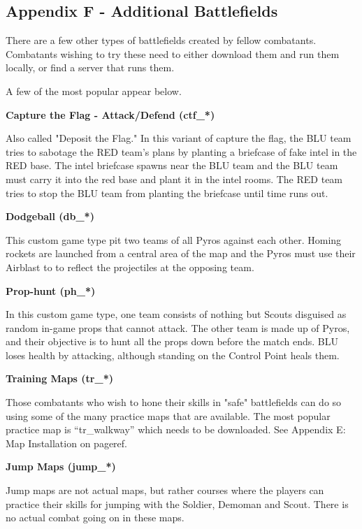 \subsection{Appendix F - Additional Battlefields}
There are a few other types of battlefields created by fellow combatants.  Combatants wishing to try these need to either download them and run them locally, or find a server that runs them.

A few of the most popular appear below.

{\bf Capture the Flag - Attack/Defend (ctf\_*)}

Also called "Deposit the Flag." In this variant of capture the flag, the BLU team tries to sabotage the RED team's plans by planting a briefcase of fake intel in the RED base. The intel briefcase spawns near the BLU team and the BLU team must carry it into the red base and plant it in the intel rooms. The RED team tries to stop the BLU team from planting the briefcase until time runs out.

{\bf Dodgeball (db\_*)}

This custom game type pit two teams of all Pyros against each other. Homing rockets are launched from a central area of the map and the Pyros must use their Airblast to to reflect the projectiles at the opposing team.

{\bf Prop-hunt (ph\_*)}

In this custom game type, one team consists of nothing but Scouts disguised as random in-game props that cannot attack. The other team is made up of Pyros, and their objective is to hunt all the props down before the match ends. BLU loses health by attacking, although standing on the Control Point heals them.

{\bf Training Maps (tr\_*)}

Those combatants who wish to hone their skills in "safe" battlefields can do so using some of the many practice maps that are available.  The most popular practice map is “tr\_walkway” which needs to be downloaded.  See Appendix E: Map Installation on {{pageref}}.

{\bf Jump Maps (jump\_*)}

Jump maps are not actual maps, but rather courses where the players can practice their skills for jumping with the Soldier, Demoman and Scout. There is no actual combat going on in these maps.